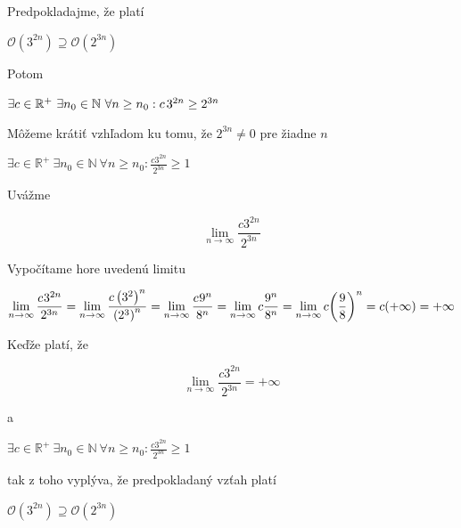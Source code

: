 \documentclass[11pt,a4paper]{article}
\begin{document}
\begin{flushright}
\begin{minipage}{0.92\textwidth}
  Predpokladajme, že platí
  \begin{center}
    $\mathcal{O}(3^{2n}) \supseteq \mathcal{O}(2^{3n})$
  \end{center}
  Potom
  \begin{center}
    $\exists c \in \mathbb{R}^{+} \ \exists n_{0} \in \mathbb{N} \ \forall n \geq n_{0}: c\hspace{0.5mm}3^{2n} \geq 2^{3n}$
  \end{center}
  Môžeme krátiť vzhľadom ku tomu, že $2^{3n} \neq 0$ pre žiadne $n$
  \begin{center}
    $\exists c \in \mathbb{R}^{+} \ \exists n_{0} \in \mathbb{N} \ \forall n \geq n_{0}: \frac{c3^{2n}}{2^{3n}} \geq 1$
  \end{center}
  Uvážme\\[-3.5em]
  \begin{center}
    $$\lim_{n\to\infty} \frac{c3^{2n}}{2^{3n}}$$
  \end{center}
\end{minipage}
\end{flushright}

\begin{flushright}
\begin{minipage}{0.92\textwidth}
  Vypočítame hore uvedenú limitu\\[-3.5em]
  \begin{center}
    $$\lim_{n\to\infty} \frac{c\hspace{0.2mm}3^{2n}}{2^{3n}} = \lim_{n\to\infty} \frac{c\left(3^2\right)^n}{\left(2^3\right)^n} = \lim_{n\to\infty} \frac{c\hspace{0.2mm}9^n}{8^n} = \lim_{n\to\infty} c\frac{9^n}{8^n} = \lim_{n\to\infty} c{\left({\frac{9}{8}}\right)}^n = c(+\infty) = +\infty$$
  \end{center}
  Keďže platí, že\\[-3.5em]
  \begin{center}
    $$\lim_{n\to\infty} \frac{c3^{2n}}{2^{3n}} = +\infty$$
  \end{center}
  a
  \begin{center}
    $\exists c \in \mathbb{R}^{+} \ \exists n_{0} \in \mathbb{N} \ \forall n \geq n_{0}: \frac{c3^{2n}}{2^{3n}} \geq 1$
  \end{center}
  tak z toho vyplýva, že predpokladaný vzťah platí
  \begin{center}
    $\mathcal{O}(3^{2n}) \supseteq \mathcal{O}(2^{3n})$
  \end{center}
\end{minipage}
\end{flushright}
\end{document}
